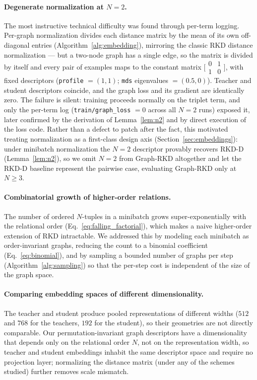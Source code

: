 \documentclass[11pt,letterpaper]{article}
\begin{document}
\paragraph{Degenerate normalization at $N = 2$.} The most instructive technical
difficulty was found through per-term logging. Per-graph normalization divides each
distance matrix by the mean of its own off-diagonal entries
(Algorithm~\ref{alg:embedding}), mirroring the classic RKD distance
normalization --- but a two-node graph has a single edge, so the matrix is divided
by itself and every pair of examples maps to the constant matrix
$\bigl[\begin{smallmatrix}0&1\\1&0\end{smallmatrix}\bigr]$, with fixed descriptors
(\texttt{profile} $= (1,1)$; \texttt{mds} eigenvalues $= (0.5, 0)$). Teacher and
student descriptors coincide, and the graph loss and its gradient are identically
zero. The failure is silent: training proceeds normally on the triplet term, and
only the per-term log (\texttt{train/graph\_loss} $= 0$ across all $N = 2$ runs)
exposed it, later confirmed by the derivation of Lemma~\ref{lem:n2} and by direct
execution of the loss code. Rather than a defect to patch after the fact, this
motivated treating normalization as a first-class design axis
(Section~\ref{sec:embeddings}): under minibatch normalization the $N = 2$ descriptor
provably recovers RKD-D (Lemma~\ref{lem:n2}), so we omit $N = 2$ from Graph-RKD
altogether and let the RKD-D baseline represent the pairwise case, evaluating
Graph-RKD only at $N \geq 3$.

\paragraph{Combinatorial growth of higher-order relations.} The number of ordered
$N$-tuples in a minibatch grows super-exponentially with the relational order
(Eq.~\ref{eq:falling_factorial}), which makes a naive higher-order extension of RKD
intractable. We addressed this by modeling each minibatch as order-invariant graphs,
reducing the count to a binomial coefficient (Eq.~\ref{eq:binomial}), and by sampling a
bounded number of graphs per step (Algorithm~\ref{alg:sampling}) so that the per-step
cost is independent of the size of the graph space.

\paragraph{Comparing embedding spaces of different dimensionality.} The teacher and
student produce pooled representations of different widths ($512$ and $768$ for the
teachers, $192$ for the student), so their geometries are not directly comparable. Our
permutation-invariant graph descriptors have a dimensionality that depends only on the
relational order $N$, not on the representation width, so teacher and student
embeddings inhabit the same descriptor space and require no projection layer;
normalizing the distance matrix (under any of the schemes studied) further removes
scale mismatch.
\end{document}
